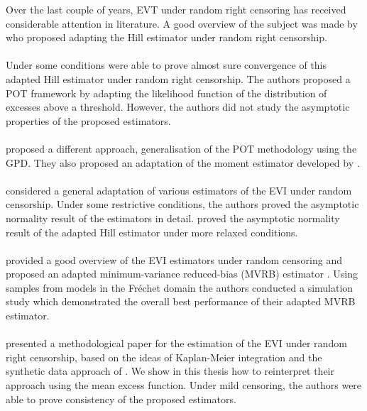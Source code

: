 
Over the last couple of years, EVT under random right censoring has received considerable attention in literature. A good overview of the subject was made by \cite{beirlant2001pareto} who proposed adapting the Hill estimator under random right censorship.
\\\\
Under some conditions \cite{delafosse2002almost} were able to prove almost sure convergence of this adapted Hill estimator under random right censorship. The authors \cite*{reiss2007statistical} proposed a POT framework by adapting the likelihood function of the distribution of excesses above a threshold. However, the authors did not study the asymptotic properties of the proposed estimators.
\\\\
\cite{beirlant2007estimation} proposed a different approach, generalisation of the POT methodology using the GPD. They also proposed an adaptation of the moment estimator developed by \cite{dekkers1989moment}.
\\\\
\cite{einmahl2008statistics} considered a general adaptation of various estimators of the EVI under random censorship. Under some restrictive conditions, the authors proved the asymptotic normality result of the estimators in detail. \cite{brahimi2015gaussian} proved the asymptotic normality result of the adapted Hill estimator under more relaxed conditions.
\\\\
\cite{gomes2011estimation} provided a good overview of the EVI estimators under random censoring and proposed an adapted minimum-variance reduced-bias (MVRB) estimator \citep{caeiro2005direct}. Using samples from models in the Fréchet domain the authors conducted a simulation study which demonstrated the overall best performance of their adapted MVRB estimator.
\\\\
\cite{worms2014new} presented a methodological paper for the estimation of the EVI under random right censorship, based on the ideas of Kaplan-Meier integration and the synthetic data approach of \cite{sue1987linear}. We show in this thesis how to reinterpret their approach using the mean excess function. Under mild censoring, the authors were able to prove consistency of the proposed estimators.
